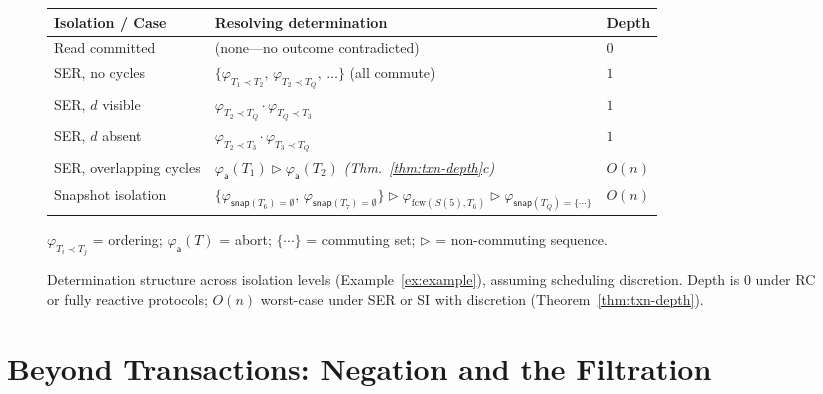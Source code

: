 \documentclass[acmsmall,review,anonymous]{acmart}
\newcommand{\snap}{\mathsf{snap}}
\newcommand{\seq}{\mathbin{\triangleright}}
\theoremstyle{remark}
\numberwithin{definition}{section}
\numberwithin{theorem}{section}
\numberwithin{lemma}{section}
\numberwithin{corollary}{section}
\numberwithin{remark}{section}
\numberwithin{example}{section}
\numberwithin{observation}{section}
\numberwithin{assumption}{section}
\begin{document}
\begin{figure}[t]
  \centering
  \footnotesize
  \setlength{\tabcolsep}{4pt}
  \renewcommand{\arraystretch}{1.15}

  \begin{tabular}{@{}lll@{}}
    \toprule
    \textbf{Isolation / Case} & \textbf{Resolving determination} & \textbf{Depth} \\
    \midrule
    Read committed &
    (none---no outcome contradicted) & $0$ \\
    SER, no cycles &
    $\{\varphi_{T_1 \prec T_2},\, \varphi_{T_2 \prec T_Q},\, \ldots\}$ (all commute) & $1$ \\
    SER, $d$ visible &
    $\varphi_{T_2 \prec T_Q} \cdot \varphi_{T_Q \prec T_3}$ & $1$ \\
    SER, $d$ absent &
    $\varphi_{T_2 \prec T_3} \cdot \varphi_{T_3 \prec T_Q}$ & $1$ \\
    SER, overlapping cycles &
    $\varphi_{\mathsf{a}}(T_1) \seq \varphi_{\mathsf{a}}(T_2)$
    \;\emph{(Thm.~\ref{thm:txn-depth}c)} & $O(n)$ \\
    Snapshot isolation &
    $\{\varphi_{\snap(T_6){=}\emptyset},\, \varphi_{\snap(T_7){=}\emptyset}\}
      \seq \varphi_{\mathrm{fcw}(S(5),T_6)}
      \seq \varphi_{\snap(T_Q){=}\{\cdots\}}$ & $O(n)$ \\
    \bottomrule
  \end{tabular}

  \smallskip
  {\footnotesize
  $\varphi_{T_i \prec T_j}$ = ordering;\;
  $\varphi_{\mathsf{a}}(T)$ = abort;\;
  $\{\cdots\}$ = commuting set;\;
  $\seq$ = non-commuting sequence.}

  \caption{
    Determination structure across isolation levels
    (Example~\ref{ex:example}), assuming scheduling discretion.
    Depth is $0$ under RC or fully reactive protocols;
    $O(n)$ worst-case under SER or SI with discretion
    (Theorem~\ref{thm:txn-depth}).
  }
  \label{fig:det-tables}
\end{figure}

\section{Beyond Transactions: Negation and the Filtration}
\label{sec:negation-preview}
\end{document}
